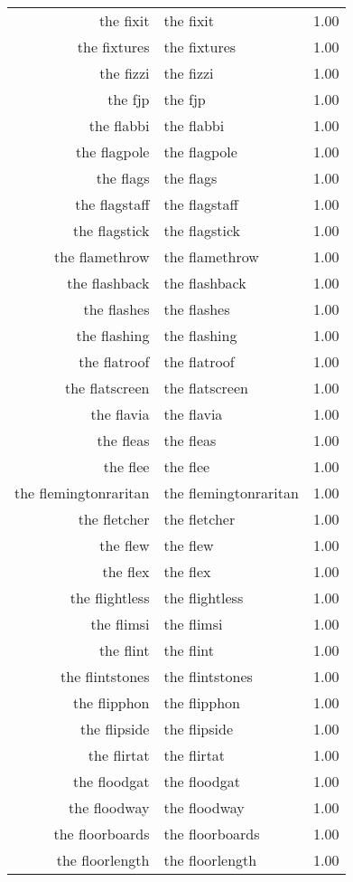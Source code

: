 \begin{table}[ht]
\begin{tabular}{rlr}
  the fixit & the fixit & 1.00 \\ 
  the fixtures & the fixtures & 1.00 \\ 
  the fizzi & the fizzi & 1.00 \\ 
  the fjp & the fjp & 1.00 \\ 
  the flabbi & the flabbi & 1.00 \\ 
  the flagpole & the flagpole & 1.00 \\ 
  the flags & the flags & 1.00 \\ 
  the flagstaff & the flagstaff & 1.00 \\ 
  the flagstick & the flagstick & 1.00 \\ 
  the flamethrow & the flamethrow & 1.00 \\ 
  the flashback & the flashback & 1.00 \\ 
  the flashes & the flashes & 1.00 \\ 
  the flashing & the flashing & 1.00 \\ 
  the flatroof & the flatroof & 1.00 \\ 
  the flatscreen & the flatscreen & 1.00 \\ 
  the flavia & the flavia & 1.00 \\ 
  the fleas & the fleas & 1.00 \\ 
  the flee & the flee & 1.00 \\ 
  the flemingtonraritan & the flemingtonraritan & 1.00 \\ 
  the fletcher & the fletcher & 1.00 \\ 
  the flew & the flew & 1.00 \\ 
  the flex & the flex & 1.00 \\ 
  the flightless & the flightless & 1.00 \\ 
  the flimsi & the flimsi & 1.00 \\ 
  the flint & the flint & 1.00 \\ 
  the flintstones & the flintstones & 1.00 \\ 
  the flipphon & the flipphon & 1.00 \\ 
  the flipside & the flipside & 1.00 \\ 
  the flirtat & the flirtat & 1.00 \\ 
  the floodgat & the floodgat & 1.00 \\ 
  the floodway & the floodway & 1.00 \\ 
  the floorboards & the floorboards & 1.00 \\ 
  the floorlength & the floorlength & 1.00 \\ 

\end{tabular}
\end{table}
